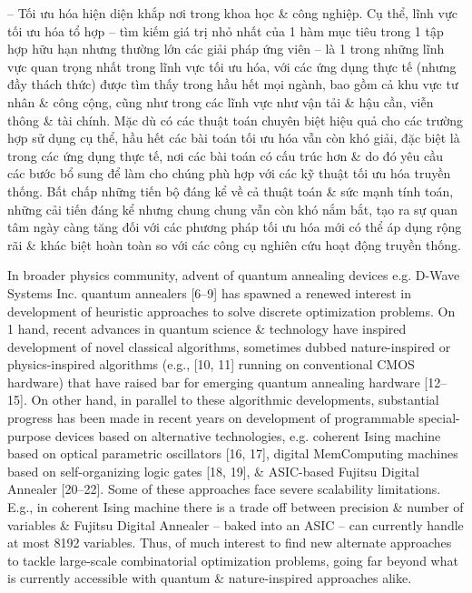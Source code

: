 \documentclass{article}
\begin{document}
\begin{itemize}
    -- Tối ưu hóa hiện diện khắp nơi trong khoa học \& công nghiệp. Cụ thể, lĩnh vực tối ưu hóa tổ hợp -- tìm kiếm giá trị nhỏ nhất của 1 hàm mục tiêu trong 1 tập hợp hữu hạn nhưng thường lớn các giải pháp ứng viên -- là 1 trong những lĩnh vực quan trọng nhất trong lĩnh vực tối ưu hóa, với các ứng dụng thực tế (nhưng đầy thách thức) được tìm thấy trong hầu hết mọi ngành, bao gồm cả khu vực tư nhân \& công cộng, cũng như trong các lĩnh vực như vận tải \& hậu cần, viễn thông \& tài chính. Mặc dù có các thuật toán chuyên biệt hiệu quả cho các trường hợp sử dụng cụ thể, hầu hết các bài toán tối ưu hóa vẫn còn khó giải, đặc biệt là trong các ứng dụng thực tế, nơi các bài toán có cấu trúc hơn \& do đó yêu cầu các bước bổ sung để làm cho chúng phù hợp với các kỹ thuật tối ưu hóa truyền thống. Bất chấp những tiến bộ đáng kể về cả thuật toán \& sức mạnh tính toán, những cải tiến đáng kể nhưng chung chung vẫn còn khó nắm bắt, tạo ra sự quan tâm ngày càng tăng đối với các phương pháp tối ưu hóa mới có thể áp dụng rộng rãi \& khác biệt hoàn toàn so với các công cụ nghiên cứu hoạt động truyền thống.

    In broader physics community, advent of quantum annealing devices e.g. D-Wave Systems Inc. quantum annealers [6--9] has spawned a renewed interest in development of heuristic approaches to solve discrete optimization problems. On 1 hand, recent advances in quantum science \& technology have inspired development of novel classical algorithms, sometimes dubbed nature-inspired or physics-inspired algorithms (e.g.,  [10, 11] running on conventional CMOS hardware) that have raised bar for emerging quantum annealing hardware [12--15]. On other hand, in parallel to these algorithmic developments, substantial progress has been made in recent years on development of programmable special-purpose devices based on alternative technologies, e.g. coherent Ising machine based on optical parametric oscillators [16, 17], digital MemComputing machines based on self-organizing logic gates [18, 19], \& ASIC-based Fujitsu Digital Annealer [20–22]. Some of these approaches face severe scalability limitations. E.g., in coherent Ising machine there is a trade off between precision \& number of variables \& Fujitsu Digital Annealer -- baked into an ASIC -- can currently handle at most 8192 variables. Thus, of much interest to find new alternate approaches to tackle large-scale combinatorial optimization problems, going far beyond what is currently accessible with quantum \& nature-inspired approaches alike.


\end{itemize}
\end{document}
